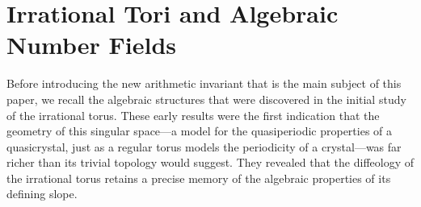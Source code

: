 \documentclass[10pt,letterpaper,reqno]{amsart}
\theoremstyle{article}
\newcommand{\1}{{\hat 1}}
\newcommand{\0}{{\hat 0}}
\begin{document}
  \section{Irrational Tori and Algebraic Number Fields}
  
  Before introducing the new arithmetic invariant that is the main subject of this paper, we recall the algebraic structures that were discovered in the initial study of the irrational torus. These early results were the first indication that the geometry of this singular space---a model for the quasiperiodic properties of a quasicrystal, just as a regular torus models the periodicity of a crystal---was far richer than its trivial topology would suggest. They revealed that the diffeology of the irrational torus retains a precise memory of the algebraic properties of its defining slope.
  
\end{document}
